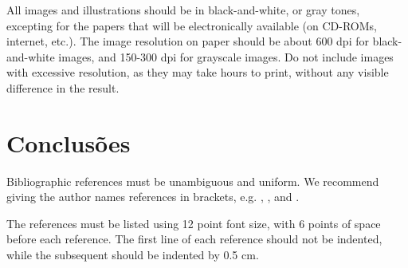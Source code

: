 \documentclass[12pt]{article}
\begin{document}
All images and illustrations should be in black-and-white, or gray tones,
excepting for the papers that will be electronically available (on CD-ROMs,
internet, etc.). The image resolution on paper should be about 600 dpi for
black-and-white images, and 150-300 dpi for grayscale images.  Do not include
images with excessive resolution, as they may take hours to print, without any
visible difference in the result. 

\section{Conclusões}
\label{sec:conclusao}

Bibliographic references must be unambiguous and uniform.  We recommend giving
the author names references in brackets, e.g. \cite{knuth:84},
\cite{boulic:91}, and \cite{smith:99}.

The references must be listed using 12 point font size, with 6 points of space
before each reference. The first line of each reference should not be
indented, while the subsequent should be indented by 0.5 cm.



\end{document}
